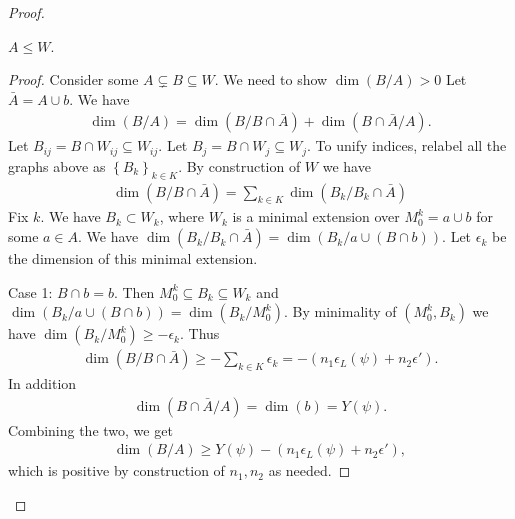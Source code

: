 \documentclass{amsart}
\newcommand{\curly}[1]{\left\{#1\right\}}
\newcommand{\paren}[1]{\left(#1\right)}
\begin{document}
\begin{proof}
  \begin{Claim}
    $A \leq W$.
  \end{Claim}
  \begin{proof}
    Consider some $A \subsetneq B \subseteq W$.
    We need to show $\dim (B/A) > 0$
    Let $\bar A = A \cup b$.
    We have
    \begin{align*}
      \dim(B/A) = \dim(B/ B \cap \bar A) + \dim(B \cap \bar A / A).
    \end{align*}
    Let $B_{ij} = B \cap W_{ij} \subseteq W_{ij}$.
    Let $B_{j} = B \cap W_{j} \subseteq W_{j}$.
    To unify indices, relabel all the graphs above as $\curly{B_k}_{k \in K}$.
    By construction of $W$ we have
    \begin{align*}
      \dim(B/ B \cap \bar A) = \sum_{k \in K} \dim(B_k/ B_k \cap \bar A)
    \end{align*}
    Fix $k$.
    We have $B_k \subset W_k$, where $W_k$ is a minimal extension over $M^k_0 = a \cup b$ for some $a \in A$.
    We have $\dim(B_k / B_k \cap \bar A) = \dim(B_k / a \cup (B \cap b))$.
    Let $\epsilon_k$ be the dimension of this minimal extension.

    Case 1: $B \cap b = b$.
    Then $M_0^k \subseteq B_k \subseteq W_k$ and $\dim(B_k / a \cup (B \cap b)) = \dim (B_k/M_0^k)$.
    By minimality of $(M_0^k, B_k)$ we have $\dim (B_k/M_0^k) \geq -\epsilon_k$.
    Thus
    \begin{align*}
      \dim(B/ B \cap \bar A) \geq - \sum_{k \in K} \epsilon_k = -\paren{n_1 \epsilon_L(\psi) + n_2 \epsilon'}.
    \end{align*}
    In addition
    \begin{align*}
      \dim(B \cap \bar A / A) = \dim (b) = Y(\psi).
    \end{align*}
    Combining the two, we get
    \begin{align*}
      \dim(B/A) \geq Y(\psi) - \paren{n_1 \epsilon_L(\psi) + n_2 \epsilon'},
    \end{align*}
    which is positive by construction of $n_1, n_2$ as needed.
    

\end{proof}
\end{proof}
\end{document}
